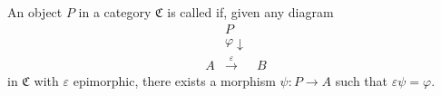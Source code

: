 An object $P$ in a category $\mathfrak{C}$ is called  if, given any diagram
$$\begin{array}{ccc}
& P & \\
& {\scriptstyle\varphi}\downarrow & \\
A & \xrightarrow{\varepsilon} & B
\end{array}$$
in $\mathfrak{C}$ with $\varepsilon$ epimorphic, there exists a morphism $\psi: P \to A$ such that $\varepsilon \psi = \varphi$.
